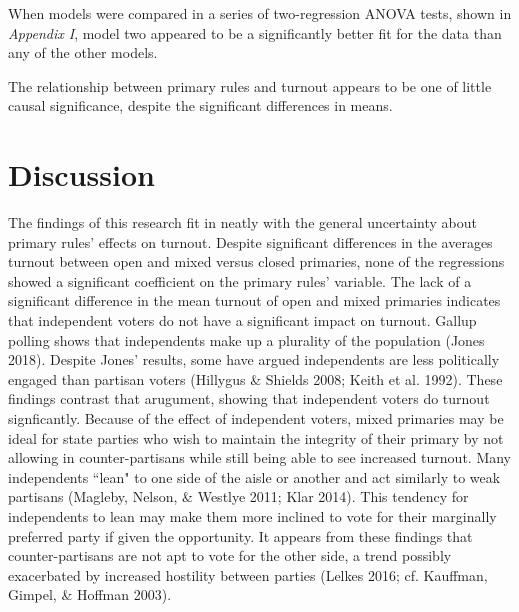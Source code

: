 \documentclass[12pt]{article}
\begin{document}
\begin{doublespace}
		When models were compared in a series of two-regression ANOVA tests, shown in \textit{Appendix I}, model two appeared to be a significantly better fit for the data than any of the other models. \par
		The relationship between primary rules and turnout appears to be one of little causal significance, despite the significant differences in means.
		
		\section{Discussion} 
		The findings of this research fit in neatly with the general uncertainty about primary rules’ effects on turnout. Despite significant differences in the averages turnout between open and mixed versus closed primaries, none of the regressions showed a significant coefficient on the primary rules’ variable. The lack of a significant difference in the mean turnout of open and mixed primaries indicates that independent voters do not have a significant impact on turnout. Gallup polling shows that independents make up a plurality of the population (Jones 2018). Despite Jones' results, some have argued independents are less politically engaged than partisan voters (Hillygus \&
Shields 2008; Keith et al. 1992). These findings contrast that arugument, showing that independent voters do turnout signficantly. Because of the effect of independent voters, mixed primaries may be ideal for state parties who wish to maintain the integrity of their primary by not allowing in counter-partisans while still being able to see increased turnout. Many independents ``lean" to one side of the aisle or another and act similarly to weak partisans (Magleby, Nelson, \& Westlye 2011; Klar 2014). This tendency for independents to lean may make them more inclined to vote for their marginally preferred party if given the opportunity. It appears from these findings that counter-partisans are not apt to vote for the other side, a trend possibly exacerbated by increased hostility between parties (Lelkes 2016; cf. Kauffman, Gimpel, \& Hoffman 2003).  \par

\end{doublespace}
\end{document}
